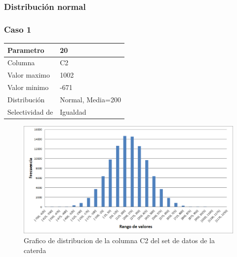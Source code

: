 	
	\subsubsection{Distribuci\'on normal}		
		
		\subsubsection*{Caso 1}
		
		\begin{tabular}{| l | l |}
		\hline
		Parametro & 20 \\
		\hline
		Columna & C2 \\
		\hline
		Valor maximo & 1002 \\
		\hline
		Valor minimo & -671 \\
		\hline
		Distribuci\'on & Normal, Media=200 \\
		\hline
		Selectividad de & Igualdad \\
		\hline
		\end{tabular}

		\newpage					

	\begin{figure}[H]
	  \begin{center}
	    \includegraphics[scale=.40]{imagenes/distro_C2.png}
	    \caption{Grafico de distribucion de la columna C2 del set de datos de la caterda} 
	    \label{fig:(distro_C2}
	  \end{center}
	\end{figure}


